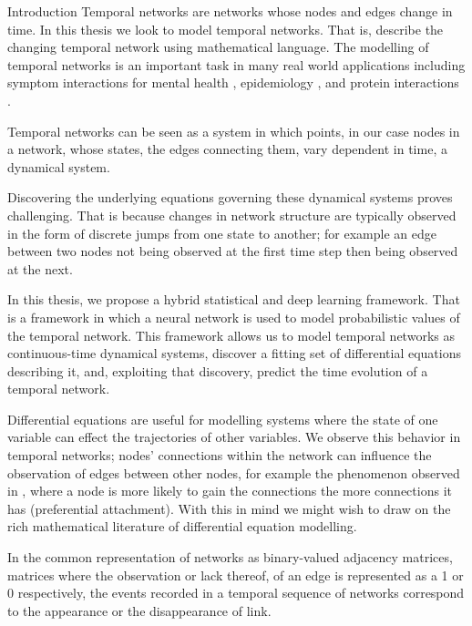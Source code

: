\documentclass[12pt]{amsbook}
\begin{document}
\begin{chapter}{Introduction}
    Temporal networks are networks whose nodes and edges change in time. In this thesis we look to model temporal networks. That is, describe the changing temporal network using mathematical language. 
    The modelling of temporal networks is an important task in many real world applications including symptom interactions for mental health \cite{jordan2020current,contreras2020temporal}, epidemiology \cite{masuda2013predicting}, and protein interactions \cite{lucas2021inferring,jin2009identifying}.

    Temporal networks can be seen as a system in which points, in our case nodes in a network, whose states, the edges connecting them, vary dependent in time, a dynamical system. 

    Discovering the underlying equations governing these dynamical systems proves challenging. That is because changes in network structure are typically observed in the form of discrete jumps from one state to another; for example an edge between two nodes not being observed at the first time step then being observed at the next.

    In this thesis, we propose a hybrid statistical and deep learning framework. That is a framework in which a neural network is used to model probabilistic values of the temporal network. This framework allows us to model temporal networks as continuous-time dynamical systems, discover a fitting set of differential equations describing it, and, exploiting that discovery, predict the time evolution of a temporal network.

    Differential equations are useful for modelling systems where the state of one variable can effect the trajectories of other variables. We observe this behavior in temporal networks; nodes' connections within the network can influence the observation of edges between other nodes, for example the phenomenon observed in \cite{newman2001clustering,capocci2006preferential}, where a node is more likely to gain the connections the more connections it has (preferential attachment). With this in mind we might wish to draw on the rich mathematical literature of differential equation modelling.

    In the common representation of networks as binary-valued adjacency matrices, matrices where the observation or lack thereof, of an edge is represented as a 1 or 0 respectively, the events recorded in a temporal sequence of networks correspond to the appearance or the disappearance of link.
   

\end{chapter}
\end{document}
